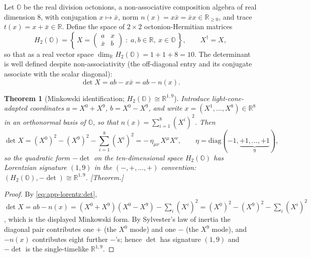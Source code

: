 \documentclass[11pt]{article}
\theoremstyle{plain}
\newtheorem{theorem}{Theorem}[section]
\theoremstyle{definition}
\theoremstyle{remark}
\begin{document}
Let $\mathbb{O}$ be the real division octonions, a non-associative composition
algebra of real dimension $8$, with conjugation $x\mapsto\bar{x}$, norm
$n(x)=x\bar{x}=\bar{x}x\in\mathbb{R}_{\ge0}$, and trace $t(x)=x+\bar{x}\in\mathbb{R}$.
Define the space of $2\times2$ octonion-Hermitian matrices
\begin{equation}
\label{eq:app-lorentz:h2def}
H_{2}(\mathbb{O})
 =\left\{\,X=\begin{pmatrix} a & x \\ \bar{x} & b \end{pmatrix}
   \;:\; a,b\in\mathbb{R},\ x\in\mathbb{O}\,\right\},
 \qquad X^{\dagger}=X,
\end{equation}
so that as a real vector space
$\dim_{\mathbb{R}}H_{2}(\mathbb{O})=1+1+8=10$. The determinant is well defined
despite non-associativity (the off-diagonal entry and its conjugate associate with
the scalar diagonal):
\begin{equation}
\label{eq:app-lorentz:det}
\det X = ab-x\bar{x}=ab-n(x).
\end{equation}

\begin{theorem}[Minkowski identification; \texorpdfstring{$H_{2}(\mathbb{O})\cong\mathbb{R}^{1,9}$}{H2(O)=R(1,9)}]
\label{thm:app-lorentz:Mink}
Introduce light-cone-adapted coordinates $a=X^{0}+X^{9}$, $b=X^{0}-X^{9}$, and write
$x=(X^{1},\dots,X^{8})\in\mathbb{R}^{8}$ in an orthonormal basis of $\mathbb{O}$, so
that $n(x)=\sum_{i=1}^{8}(X^{i})^{2}$. Then
\begin{equation}
\label{eq:app-lorentz:detmink}
\det X = (X^{0})^{2}-(X^{9})^{2}-\sum_{i=1}^{8}(X^{i})^{2}
       = -\,\eta_{\mu\nu}\,X^{\mu}X^{\nu},
\qquad
\eta=\mathrm{diag}(-1,\underbrace{+1,\dots,+1}_{9}),
\end{equation}
so the quadratic form $-\det$ on the ten-dimensional space $H_{2}(\mathbb{O})$ has
Lorentzian signature $(1,9)$ in the $(-,+,\dots,+)$ convention:
$(H_{2}(\mathbb{O}),-\det)\cong\mathbb{R}^{1,9}$. \emph{[Theorem.]}
\end{theorem}

\begin{proof}
By \eqref{eq:app-lorentz:det},
$\det X=ab-n(x)=(X^{0}+X^{9})(X^{0}-X^{9})-\sum_{i}(X^{i})^{2}
=(X^{0})^{2}-(X^{9})^{2}-\sum_{i}(X^{i})^{2}$, which is the displayed Minkowski
form. By Sylvester's law of inertia the diagonal pair contributes one $+$ (the
$X^{0}$ mode) and one $-$ (the $X^{9}$ mode), and $-n(x)$ contributes eight further
$-$'s; hence $\det$ has signature $(1,9)$ and $-\det$ is the single-timelike
$\mathbb{R}^{1,9}$.
\end{proof}
\end{document}
